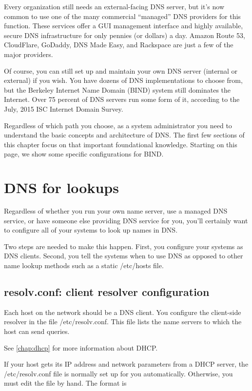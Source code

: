 Every organization still needs an external-facing DNS server, but it's now common to use one of the many commercial ``managed'' DNS providers for this function.
These services offer a GUI management interface and highly available, secure DNS infrastructure for only pennies (or dollars) a day.
Amazon Route 53, CloudFlare, GoDaddy, DNS Made Easy, and Rackspace are just a few of the major providers.

Of course, you can still set up and maintain your own DNS server
(internal or external) if you wish. You have dozens of DNS
implementations to choose from, but the Berkeley Internet Name Domain (BIND) system still dominates the Internet.
Over 75 percent of DNS servers run some form of it, according to the July, 2015 ISC Internet Domain Survey.

Regardless of which path you choose, as a system administrator you need to understand the basic concepts and architecture of DNS.
The first few sections of this chapter focus on that important foundational knowledge.
Starting on this page, we show some specific configurations for BIND.


\section{DNS for lookups}

Regardless of whether you run your own name server, use a managed DNS service, or have someone else providing DNS service for you, you'll certainly want
to configure all of your systems to look up names in DNS.

Two steps are needed to make this happen. First, you configure your
systems as DNS clients. Second, you tell the systems when to use DNS as
opposed to other name lookup methods such as a static {/etc/hosts} file.


\subsection{resolv.conf: client resolver configuration}

Each host on the network should be a DNS client.
You configure the client-side resolver in the file /etc/resolv.conf.
This file lists the name servers to which the host can send queries.

See \cref{chap:dhcp} for more information about DHCP.

If your host gets its IP address and network parameters from a DHCP
server, the {/etc/resolv.conf} file is normally set up for you
automatically. Otherwise, you must edit the file by hand. The format is

